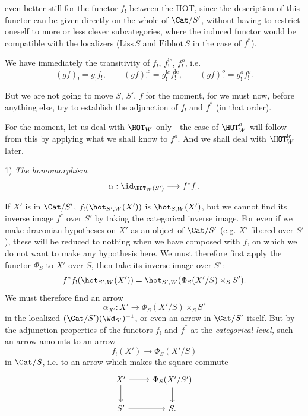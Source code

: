 even better still for the functor $f_!$ between the HOT, since the description of this functor can be given directly on the whole of $\Cat/S'$, without having to restrict oneself to more or less clever subcategories, where the induced functor would be compatible with the localizers ($\underline{\mathrm{Liss}}\,S$ and $\underline{\mathrm{Fibhot}}\,S$ in the case of $f^*$).

We have immediately the transitivity of $f_!$, $f_!^{\mathrm{lc}}$, $f_!^{o}$, i.e.
\[
(gf)_! = g_!f_!, \qquad (gf)_!^{\mathrm{lc}} = g_!^{\mathrm{lc}}f_!^{\mathrm{lc}}, \qquad (gf)_!^{o} = g_!^{o}f_!^{o}.
\]

But we are not going to move $S$, $S'$, $f$ for the moment, for we must now, before anything else, try to establish the adjunction of $f_!$ and $f^*$ (in that order).

For the moment, let us deal with $\HOT_W$ only - the case of $\HOT_W^{o}$ will follow from this by applying what we shall know to $f^{o}$. And we shall deal with $\HOT_W^{\mathrm{lc}}$ later.

1) \textit{The homomorphism}
\[
\alpha : \id_{\HOT_W(S')} \longrightarrow f^*f_!.
\]

If $X'$ is in $\Cat/S'$, $f_!(\hot_{S',W}(X'))$ is $\hot_{S,W}(X')$, but we cannot find its inverse image $f^*$ over $S'$ by taking the categorical inverse image. For even if we make draconian hypotheses on $X'$ as an object of $\Cat/S'$ (e.g. $X'$ fibered over $S'$), these will be reduced to nothing when we have composed with $f$, on which we do not want to make any hypothesis here. We must therefore first apply the functor $\Phi_S$ to $X'$ over $S$, then take its inverse image over $S'$:
\[
f^*f_!(\hot_{S',W}(X')) = \hot_{S',W}(\Phi_S(X'/S)\times_S S').
\]
We must therefore find an arrow
\[
\alpha_{X'} : X' \longrightarrow \Phi_S(X'/S)\times_S S'
\]
in the localized $(\Cat/S')(\Wd_{S'})^{-1}$, or even an arrow in $\Cat/S'$ itself. But by the adjunction properties of the functors $f_!$ and $f^*$ at the \textit{categorical level,} such an arrow amounts to an arrow
\[
f_!(X') \longrightarrow \Phi_S(X'/S)
\]
in $\Cat/S$, i.e. to an arrow which makes the square commute
\[
\begin{tikzcd}
X' \arrow[r] \arrow[d] & \Phi_S(X'/S') \arrow[d] \\ %
S' \arrow[r] & S.
\end{tikzcd}
\]

